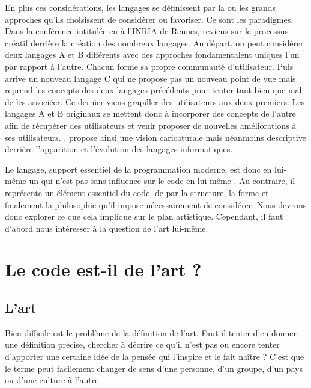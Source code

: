 \documentclass[12pt]{article} %
\begin{document}
En plus ces considérations, les langages se définissent par la ou les grands approches qu'ils choisissent de considérer ou favoriser. Ce sont les paradigmes. Dans la conférence intitulée  en  à l'INRIA de Rennes, \citeauthor{GerardBerry2015} reviens sur le processus créatif derrière la création des nombreux langages. Au départ, on peut considérer deux langages A et B différents avec des approches fondamentalent uniques l'un par rapport à l'autre. Chacun forme sa propre communauté d'utilisateur. Puis arrive un nouveau langage C qui ne propose pas un nouveau point de vue mais reprend les concepts des deux langages précédents pour tenter tant bien que mal de les associéer. Ce dernier viens grapiller des utilisateurs aux deux premiers. Les langages A et B originaux se mettent donc à incorporer des concepts de l'autre afin de récupérer des utilisateurs et venir proposer de nouvelles améliorations à ses utilisateurs. \cite{GerardBerry2015}. \citeauthor{GerardBerry2015} propose ainsi une vision caricaturale mais néanmoins descriptive derrière l'apparition et l'évolution des langages informatiques.

Le langage, support essentiel de la programmation moderne, est donc en lui-même un  \cite{GerardBerry2015} qui n'est pas sans influence sur le code en lui-même \cite{Dijkstra1976}. Au contraire, il représente un élément essentiel du code, de par la structure, la forme et finalement la philosophie qu'il impose nécessairement de considérer. Nous devrons donc explorer ce que cela implique sur le plan artistique. Cependant, il faut d'abord nous intéresser à la question de l'art lui-même.

\section{Le code est-il de l'art ?}

\subsection{L'art}
Bien difficile est le problème de la définition de l'art. Faut-il tenter d'en donner une définition précise, chercher à décrire ce qu'il n'est pas ou encore tenter d'apporter une certaine idée de la pensée qui l'inspire et le fait naître ? C'est que le terme peut facilement changer de sens d'une personne, d'un groupe, d'un pays ou d'une culture à l'autre.
\end{document}
